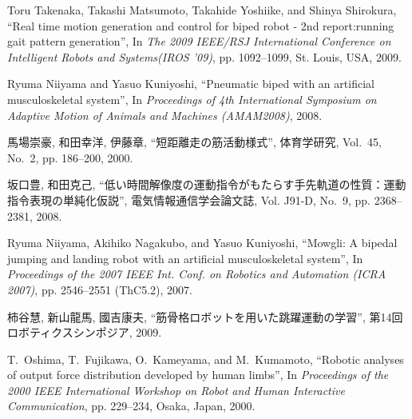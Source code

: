 \documentclass[10pt,a4paper]{jsarticle}
\begin{document}
\begin{footnotesize}

\begin{thebibliography}{10}

Toru Takenaka, Takashi Matsumoto, Takahide Yoshiike, and Shinya Shirokura,
\newblock ``Real time motion generation and control for biped robot - 2nd
  report:running gait pattern generation'',
\newblock In {\em The 2009 IEEE/RSJ International Conference on Intelligent
  Robots and Systems({IROS} '09)}, pp. 1092--1099, St. Louis, USA, 2009.

Ryuma Niiyama and Yasuo Kuniyoshi,
\newblock ``Pneumatic biped with an artificial musculoskeletal system'',
\newblock In {\em Proceedings of 4th International Symposium on Adaptive Motion
  of Animals and Machines (AMAM2008)}, 2008.

馬場崇豪, 和田幸洋, 伊藤章,
\newblock ``短距離走の筋活動様式'',
\newblock 体育学研究, Vol.~45, No.~2, pp. 186--200, 2000.

坂口豊, 和田克己,
\newblock
  ``低い時間解像度の運動指令がもたらす手先軌道の性質：運動指令表現の単純化仮説'',
\newblock 電気情報通信学会論文誌, Vol. J91-D, No.~9, pp. 2368--2381, 2008.

Ryuma Niiyama, Akihiko Nagakubo, and Yasuo Kuniyoshi,
\newblock ``Mowgli: A bipedal jumping and landing robot with an artificial
  musculoskeletal system'',
\newblock In {\em Proceedings of the 2007 IEEE Int. Conf. on Robotics and
  Automation (ICRA 2007)}, pp. 2546--2551 (ThC5.2), 2007.

柿谷慧, 新山龍馬, 國吉康夫,
\newblock ``筋骨格ロボットを用いた跳躍運動の学習'',
\newblock  第14回ロボティクスシンポジア, 2009.

T.~Oshima, T.~Fujikawa, O.~Kameyama, and M.~Kumamoto,
\newblock ``Robotic analyses of output force distribution developed by human
  limbs'',
\newblock In {\em Proceedings of the 2000 IEEE International Workshop on Robot
  and Human Interactive Communication}, pp. 229--234, Osaka, Japan, 2000.


\end{thebibliography}
\end{footnotesize}
\end{document}
